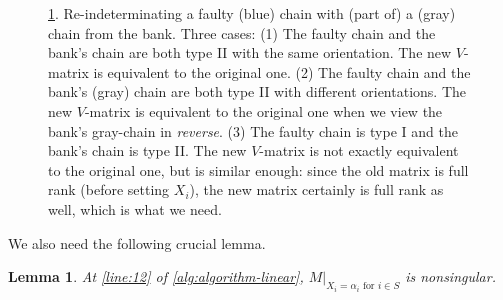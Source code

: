 \documentclass[11pt]{article}
\theoremstyle{plain}
\newtheorem{lemma}[thm]{Lemma}
\theoremstyle{definition}
\theoremstyle{remark}
\begin{document}
\begin{figure}
    \caption{\cref{lem:nonsingular}. Re-indeterminating a faulty (blue) chain with (part of) a (gray) chain from the bank. Three cases: 
    (1) The faulty chain and the bank's chain are both type II with the same orientation.  The new $V$-matrix is equivalent to the original one. 
    (2) The faulty chain and the bank's (gray) chain are both type II with different orientations. The new $V$-matrix is equivalent to the original one when we view the bank's gray-chain in \emph{reverse}.
    (3) The faulty chain is type I and the bank's chain is type II. The new $V$-matrix is not exactly equivalent to the original one, but is similar enough: since the old matrix is full rank (before setting $X_i$), the new matrix certainly is full rank as well, which is what we need.
    }
    \label{fig:replace}
\end{figure}

We also need the following crucial lemma.

\begin{lemma}\label{lem:nonsingular}
At \cref{line:12} of \cref{alg:algorithm-linear}, $M|_{X_i=\alpha_i \text{ for } i\in S}$ is nonsingular.
\end{lemma}
\end{document}
